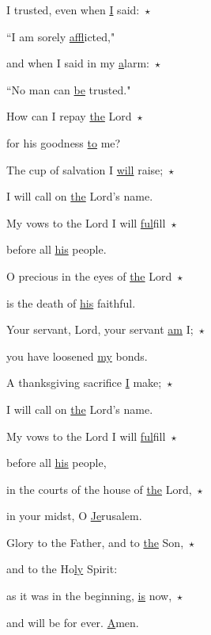 \noindent I trusted, even when \uline{I} said:~$\star$~\nopagebreak

``I am sorely \uline{af}flicted,"

\noindent and when I said in my \uline{a}larm:~$\star$~\nopagebreak

``No man can \uline{be} trusted."

\noindent How can I repay \uline{the} Lord~$\star$~\nopagebreak

for his goodness \uline{to} me?

\noindent The cup of salvation I \uline{will} raise;~$\star$~\nopagebreak

I will call on \uline{the} Lord’s name.

\noindent My vows to the Lord I will \uline{ful}fill~$\star$~\nopagebreak

before all \uline{his} people.

\noindent O precious in the eyes of \uline{the} Lord~$\star$~\nopagebreak

is the death of \uline{his} faithful.

\noindent Your servant, Lord, your servant \uline{am} I;~$\star$~\nopagebreak

you have loosened \uline{my} bonds.

\noindent A thanksgiving sacrifice \uline{I} make;~$\star$~\nopagebreak

I will call on \uline{the} Lord’s name.

\noindent My vows to the Lord I will \uline{ful}fill~$\star$~\nopagebreak

before all \uline{his} people,

\noindent in the courts of the house of \uline{the} Lord,~$\star$~\nopagebreak

in your midst, O \uline{Je}rusalem.

\noindent Glory to the Father, and to \uline{the} Son,~$\star$~\nopagebreak

and to the Ho\uline{ly} Spirit:

\noindent as it was in the beginning, \uline{is} now,~$\star$~\nopagebreak

and will be for ever. \uline{A}men.
